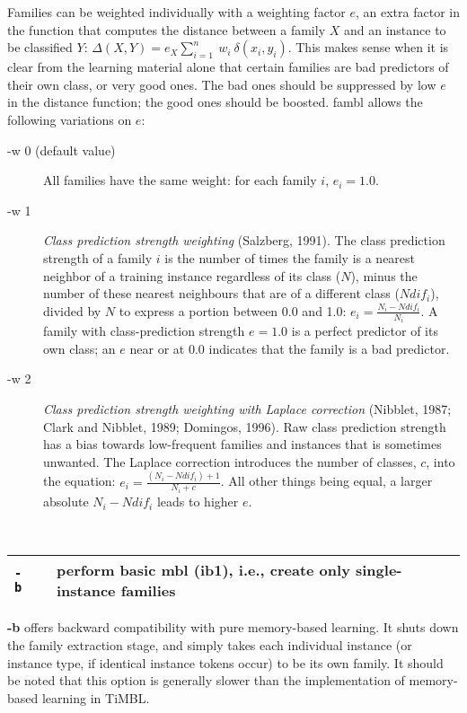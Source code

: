 \documentclass[11pt]{article}
\begin{document}
Families can be weighted individually with a weighting factor
$e$, an extra factor in the function that computes the distance
between a family $X$ and an instance to be classified $Y$:
$\Delta(X,Y) = e_{X} \sum_{i=1}^{n}\ w_{i}\
\delta(x_{i},y_{i})$. This makes sense when it is clear from the
learning material alone that certain families are bad predictors of
their own class, or very good ones. The bad ones should be suppressed
by low $e$ in the distance function; the good ones should be
boosted. {\sc fambl} allows the following variations on $e$:

\begin{description}
\item[-w 0 (default value)] All families have the same weight: for
each family $i$, $e_{i}=1.0$.
\item[-w 1] {\em Class prediction strength weighting} (Salzberg,
1991). The class prediction strength of a family $i$ is the number of
times the family is a nearest neighbor of a training instance
regardless of its class ($N$), minus the number of these nearest
neighbours that are of a different class ($Ndif_{i}$), divided by $N$
to express a portion between 0.0 and 1.0: $e_{i} =
\frac{N_{i}-Ndif_{i}}{N_{i}}$. A family with class-prediction
strength $e=1.0$ is a perfect predictor of its own class; an $e$ near
or at $0.0$ indicates that the family is a bad predictor.
\item[-w 2] {\em Class prediction strength weighting with Laplace
correction} (Nibblet, 1987; Clark and Nibblet, 1989; Domingos,
1996). Raw class prediction strength has a bias towards low-frequent
families and instances that is sometimes unwanted. The Laplace
correction introduces the number of classes, $c$, into the equation:
$e_{i} = \frac{(N_{i}-Ndif_{i})+1}{N_{i}+c}$. All other things being
equal, a larger absolute $N_{i}-Ndif_{i}$ leads to higher $e$.
\end{description}
\ \\

\begin{tabular}{|p{}|p{}|p{}|}
\hline
{\tt -b} & & perform basic {\sc mbl} ({\sc ib1}), i.e., create only 
single-instance families \\
\hline
\end{tabular}

{\bf -b} offers backward compatibility with pure memory-based
learning. It shuts down the family extraction stage, and simply takes
each individual instance (or instance type, if identical instance
tokens occur) to be its own family. It should be noted that this option
is generally slower than the implementation of memory-based learning
in TiMBL. 
\ \\
\end{document}
